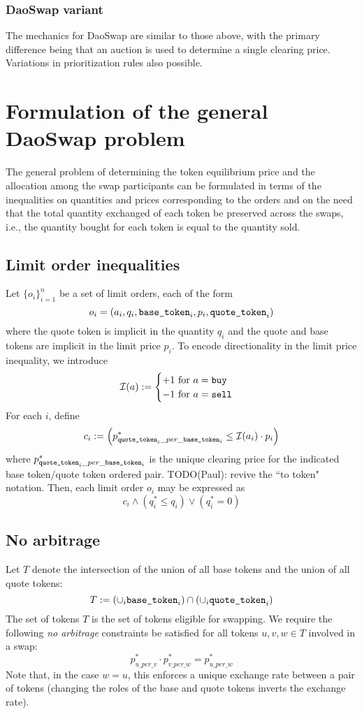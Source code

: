 \documentclass[11pt, reqno]{amsart}
\newcommand{\basetoken}{\textnormal{\texttt{base\_token}}}
\newcommand{\quotetoken}{\textnormal{\texttt{quote\_token}}}
\newcommand{\buy}{\textnormal{\texttt{buy}}}
\newcommand{\sell}{\textnormal{\texttt{sell}}}
\begin{document}
\subsubsection{DaoSwap variant}
The mechanics for DaoSwap are similar to those above, with the primary
difference being that an auction is used to determine a single clearing price.
Variations in prioritization rules also possible.


\section{Formulation of the general DaoSwap problem}
The general problem of determining the token equilibrium price and the
allocation among the swap participants can be formulated in terms of the
inequalities on quantities and prices corresponding to the orders and on the
need that the total quantity exchanged of each token be preserved across the
swaps, i.e., the quantity bought for each token is equal to the quantity sold.

\subsection{Limit order inequalities}
Let $\{o_i\}_{i = 1}^n$ be a set of limit orders, each of the form
\[
	o_i = (a_i, q_i, \basetoken_i, p_i, \quotetoken_i)
\]
where the quote token is implicit in the quantity $q_i$ and the quote and base
tokens are implicit in the limit price $p_i$.
To encode directionality in the limit price inequality, we introduce
\[
	\mathcal{I}(a) :=
	\begin{cases}
		+1 \text{ for } a = \buy  \\
		-1 \text{ for } a = \sell \\
	\end{cases}
\]
For each $i$, define
\[
	c_i := \left(
	p^*_{\quotetoken_i\_per\_\basetoken_i} \leq \mathcal{I}(a_i) \cdot p_i
	\right)
\]
where $p^*_{\quotetoken_i\_per\_\basetoken_i}$ is the unique clearing price for
the indicated base token/quote token ordered pair.
TODO(Paul): revive the ``to token" notation.
Then, each limit order $o_i$ may be expressed as
\[
	c_i \land
	(q_i^* \leq q_i) \lor
	(q_i^* = 0)
\]

\subsection{No arbitrage}
Let $T$ denote the intersection of the union of all base tokens and the union
of all quote tokens:
\[
	T :=
	\left( \cup_i \basetoken_i \right)
	\cap
	\left( \cup_i \quotetoken_i \right)
\]
The set of tokens $T$ is the set of tokens eligible for swapping.
We require the following \emph{no arbitrage}
constraints be satisfied for all tokens $u, v, w \in T$
involved in a swap:
\[
	p^*_{u\_per\_v} \cdot
	p^*_{v\_per\_w} =
	p^*_{u\_per\_w}
\]
Note that, in the case $w = u$, this enforces a unique exchange rate between
a pair of tokens (changing the roles of the base and quote tokens inverts the
exchange rate).
\end{document}
